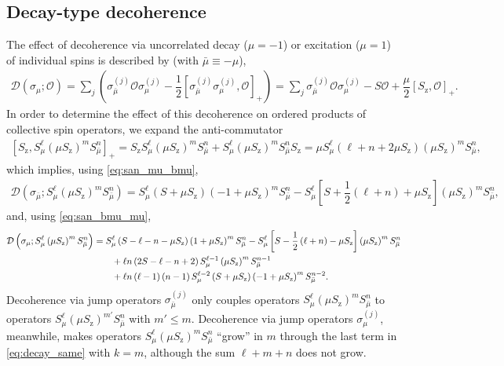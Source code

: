 \documentclass[aps,notitlepage,nofootinbib,11pt]{revtex4-1}
\newcommand{\f}[2]{\dfrac{#1}{#2}} %
\newcommand{\p}[1]{\left(#1\right)} %
\renewcommand{\sp}[1]{\left[#1\right]} %
\newcommand{\D}{\mathcal{D}}
\renewcommand{\O}{\mathcal{O}}
\newcommand{\z}{\text{z}}
\newcommand{\bmu}{{\bar\mu}}
\newcommand{\1}{\mathds{1}}
\begin{document}
\subsection{Decay-type decoherence}
\label{sec:decay_single}

The effect of decoherence via uncorrelated decay ($\mu=-1$) or
excitation ($\mu=1$) of individual spins is described by (with
$\bmu\equiv-\mu$),
\begin{align}
  \D\p{\sigma_\mu; \O}
  = \sum_j\p{\sigma_\bmu^{(j)} \O \sigma_\mu^{(j)}
    - \f12\sp{\sigma_\bmu^{(j)} \sigma_\mu^{(j)},\O}_+}
  = \sum_j \sigma_\bmu^{(j)} \O \sigma_\mu^{(j)}
    - S \O + \f{\mu}{2} \sp{S_\z, \O}_+.
\end{align}
In order to determine the effect of this decoherence on ordered
products of collective spin operators, we expand the anti-commutator
\begin{align}
  \sp{S_\z, S_\mu^\ell \p{\mu S_\z}^m S_\bmu^n}_+
  = S_\z S_\mu^\ell \p{\mu S_\z}^m S_\bmu^n
  + S_\mu^\ell \p{\mu S_\z}^m S_\bmu^n S_\z
  = \mu S_\mu^\ell\p{\ell+n+2\mu S_\z} \p{\mu S_\z}^m S_\bmu^n,
\end{align}
which implies, using \eqref{eq:san_mu_bmu},
\begin{align}
  \D\p{\sigma_\bmu; S_\mu^\ell \p{\mu S_\z}^m S_\bmu^n}
  = S_\mu^\ell \p{S+\mu S_\z}\p{-1+\mu S_\z}^m S_\bmu^n
  - S_\mu^\ell\sp{S + \f12\p{\ell+n} + \mu S_\z}
  \p{\mu S_\z}^m S_\bmu^n,
  \label{eq:decay_diff}
\end{align}
and, using \eqref{eq:san_bmu_mu},
\begin{align}
  \D\p{\sigma_\mu; S_\mu^\ell \p{\mu S_\z}^m S_\bmu^n}
  &= S_\mu^\ell \p{S - \ell - n - \mu S_\z} \p{1+\mu S_\z}^m S_\bmu^n
  - S_\mu^\ell\sp{S - \f12\p{\ell+n} - \mu S_\z}
  \p{\mu S_\z}^m S_\bmu^n \notag \\
  &\qquad + \ell n \p{2S - \ell - n + 2}
  S_\mu^{\ell-1} \p{\mu S_\z}^m S_\bmu^{n-1} \notag \\
  &\qquad + \ell n \p{\ell-1} \p{n-1} S_\mu^{\ell-2} \p{S + \mu S_\z}
  \p{-1+\mu S_\z}^m S_\bmu^{n-2}.
  \label{eq:decay_same}
\end{align}
Decoherence via jump operators $\sigma_\bmu^{(j)}$ only couples
operators $S_\mu^\ell \p{\mu S_\z}^m S_\bmu^n$ to operators
$S_\mu^\ell \p{\mu S_\z}^{m'} S_\bmu^n$ with $m'\le m$.  Decoherence
via jump operators $\sigma_\mu^{(j)}$, meanwhile, makes operators
$S_\mu^\ell \p{\mu S_\z}^m S_\bmu^n$ ``grow'' in $m$ through the last
term in \eqref{eq:decay_same} with $k=m$, although the sum $\ell+m+n$
does not grow.
\end{document}

